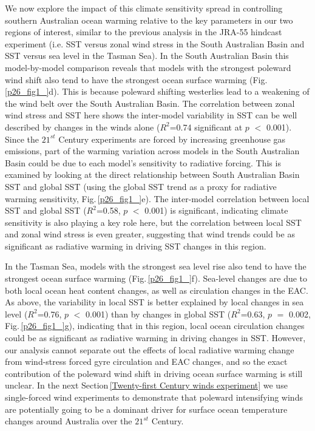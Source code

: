 \documentclass[draft,linenumbers]{agujournal2018}
\begin{document}
We now explore the impact of this climate sensitivity spread in controlling southern Australian ocean warming relative to the key parameters in our two regions of interest, similar to the previous analysis in the JRA-55 hindcast experiment (i.e. SST versus zonal wind stress in the South Australian Basin and SST versus sea level in the Tasman Sea). In the South Australian Basin this model-by-model comparison reveals that models with the strongest poleward wind shift also tend to have the strongest ocean surface warming (Fig.\,\ref{p26_fig1_}d). This is because poleward shifting westerlies lead to a weakening of the wind belt over the South Australian Basin. The correlation between zonal wind stress and SST here shows the inter-model variability in SST can be well described by changes in the winds alone ($R^2$=0.74 significant at $p$ $<$ 0.001). Since the $21^{st}$ Century experiments are forced by increasing greenhouse gas emissions, part of the warming variation across models in the South Australian Basin could be due to each model's sensitivity to radiative forcing. This is examined by looking at the direct relationship between South Australian Basin SST and global SST (using the global SST trend as a proxy for radiative warming sensitivity, Fig.\,\ref{p26_fig1_}e). The inter-model correlation between local SST and global SST ($R^2$=0.58, $p$ $<$ 0.001) is significant, indicating climate sensitivity is also playing a key role here, but the correlation between local SST and zonal wind stress is even greater, suggesting that wind trends could be as significant as radiative warming in driving SST changes in this region.

In the Tasman Sea, models with the strongest sea level rise also tend to have the strongest ocean surface warming (Fig.\,\ref{p26_fig1_}f). Sea-level changes are due to both local ocean heat content changes, as well as circulation changes in the EAC. As above, the variability in local SST is better explained by local changes in sea level ($R^2$=0.76, $p$ $<$ 0.001) than by changes in global SST ($R^2$=0.63, $p$ $=$ 0.002, Fig.\,\ref{p26_fig1_}g), indicating that in this region, local ocean circulation changes could be as significant as radiative warming in driving changes in SST. However, our analysis cannot separate out the effects of local radiative warming change from wind-stress forced gyre circulation and EAC changes, and so the exact contribution of the poleward wind shift in driving ocean surface warming is still unclear. In the next Section\,\ref{Twenty-first Century winds experiment} we use single-forced wind experiments to demonstrate that poleward intensifying winds are potentially going to be a dominant driver for surface ocean temperature changes around Australia over the $21^{st}$ Century.
\end{document}
